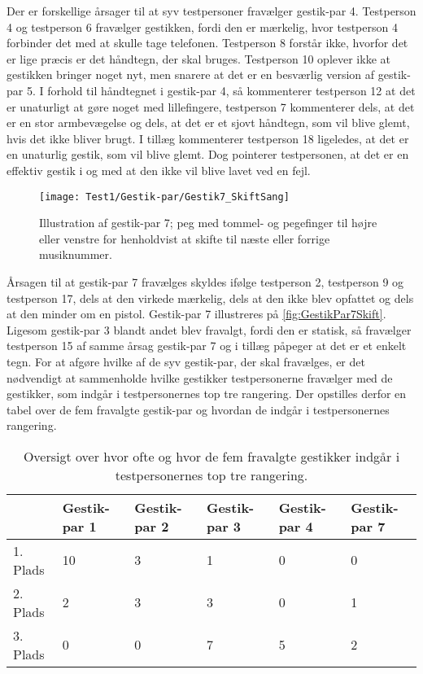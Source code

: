 \noindent
%
Der er forskellige årsager til at syv testpersoner fravælger gestik-par 4. Testperson 4 og testperson 6 fravælger gestikken, fordi den er mærkelig, hvor testperson 4 forbinder det med at skulle tage telefonen. Testperson 8 forstår ikke, hvorfor det er lige præcis er det håndtegn, der skal bruges. Testperson 10 oplever ikke at gestikken bringer noget nyt, men snarere at det er en besværlig version af gestik-par 5. I forhold til håndtegnet i gestik-par 4, så kommenterer testperson 12 at det er unaturligt at gøre noget med lillefingere, testperson 7 kommenterer dels, at det er en stor armbevægelse og dels, at det er et sjovt håndtegn, som vil blive glemt, hvis det ikke bliver brugt. I tillæg kommenterer testperson 18 ligeledes, at det er en unaturlig gestik, som vil blive glemt. Dog pointerer testpersonen, at det er en effektiv gestik i og med at den ikke vil blive lavet ved en fejl.
%
\begin{figure}[H]
	\centering
	\texttt{[image: Test1/Gestik-par/Gestik7\_SkiftSang]}
	\caption{Illustration af gestik-par 7; peg med tommel- og pegefinger til højre eller venstre for henholdvist at skifte til næste eller forrige musiknummer.}
	\label{fig:GestikPar7Skift}
\end{figure}
\noindent
% 
Årsagen til at gestik-par 7 fravælges skyldes ifølge testperson 2, testperson 9 og testperson 17, dels at den virkede mærkelig, dels at den ikke blev opfattet og dels at den minder om en pistol. Gestik-par 7 illustreres på \autoref{fig:GestikPar7Skift}. Ligesom gestik-par 3 blandt andet blev fravalgt, fordi den er statisk, så fravælger testperson 15 af samme årsag gestik-par 7 og i tillæg påpeger at det er et enkelt tegn.\blankline
%
For at afgøre hvilke af de syv gestik-par, der skal fravælges, er det nødvendigt at sammenholde hvilke gestikker testpersonerne fravælger med de gestikker, som indgår i testpersonernes top tre rangering. Der opstilles derfor en tabel over de fem fravalgte gestik-par og hvordan de indgår i testpersonernes rangering.    
%
\begin{table}[H]
	\centering
	\begin{tabular}{ | p{1.5cm} | p{2.1cm} | p{2.1cm} | p{2.1cm} | p{2.1cm} | p{2.1cm} |}
	\hline
		 & Gestik-par 1 & Gestik-par 2 & Gestik-par 3 & Gestik-par 4 & Gestik-par 7 \\ \hline
		1. Plads & 10 & 3 & 1 & 0 & 0\\ \hline
		2. Plads & 2 & 3 & 3 & 0 & 1\\ \hline
		3. Plads & 0 & 0 & 7 & 5 & 2\\ \hline
	\end{tabular}
	\caption{Oversigt over hvor ofte og hvor de fem fravalgte gestikker indgår i testpersonernes top tre rangering.}
	\label{tab:FravalgteTopTreSkift}
\end{table}

